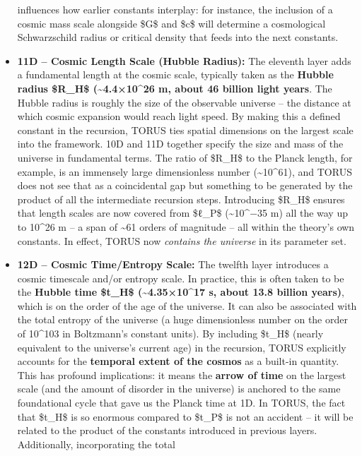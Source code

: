 \begin{itemize}
  influences how earlier constants interplay: for instance, the
  inclusion of a cosmic mass scale alongside \$G\$ and \$c\$ will
  determine a cosmological Schwarzschild radius or critical density that
  feeds into the next constants.
\item
  \textbf{11D -- Cosmic Length Scale (Hubble Radius):} The eleventh
  layer adds a fundamental length at the cosmic scale, typically taken
  as the \textbf{Hubble radius \$R\_H\$ (\textasciitilde{}4.4×10\^{}26
  m, about 46 billion light years}. The Hubble radius is roughly the
  size of the observable universe -- the distance at which cosmic
  expansion would reach light speed. By making this a defined constant
  in the recursion, TORUS ties spatial dimensions on the largest scale
  into the framework. 10D and 11D together specify the size and mass of
  the universe in fundamental terms. The ratio of \$R\_H\$ to the Planck
  length, for example, is an immensely large dimensionless number
  (\textasciitilde{}10\^{}61), and TORUS does not see that as a
  coincidental gap but something to be generated by the product of all
  the intermediate recursion steps. Introducing \$R\_H\$ ensures that
  length scales are now covered from \$ℓ\_P\$
  (\textasciitilde{}10\^{}−35 m) all the way up to 10\^{}26 m -- a span
  of \textasciitilde{}61 orders of magnitude -- all within the theory's
  own constants. In effect, TORUS now \emph{contains the universe} in
  its parameter set.
\item
  \textbf{12D -- Cosmic Time/Entropy Scale:} The twelfth layer
  introduces a cosmic timescale and/or entropy scale. In practice, this
  is often taken to be the \textbf{Hubble time \$t\_H\$
  (\textasciitilde{}4.35×10\^{}17 s, about 13.8 billion years)}, which
  is on the order of the age of the universe​. It can also be associated
  with the total entropy of the universe (a huge dimensionless number on
  the order of 10\^{}103 in Boltzmann's constant units). By including
  \$t\_H\$ (nearly equivalent to the universe's current age) in the
  recursion, TORUS explicitly accounts for the \textbf{temporal extent
  of the cosmos} as a built-in quantity. This has profound implications:
  it means the \textbf{arrow of time} on the largest scale (and the
  amount of disorder in the universe) is anchored to the same
  foundational cycle that gave us the Planck time at 1D. In TORUS, the
  fact that \$t\_H\$ is so enormous compared to \$t\_P\$ is not an
  accident -- it will be related to the product of the constants
  introduced in previous layers. Additionally, incorporating the total

\end{itemize}
